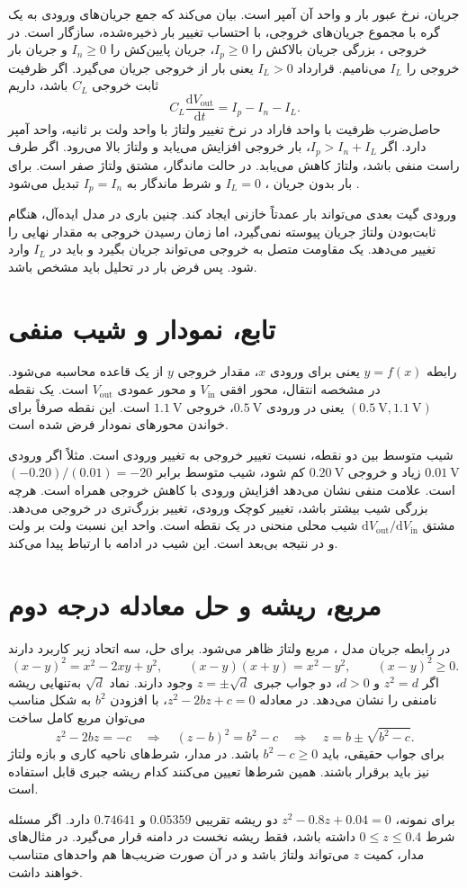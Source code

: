 جریان، نرخ عبور بار و واحد آن آمپر است.
 بیان می‌کند که جمع جریان‌های
ورودی به یک گره با مجموع جریان‌های خروجی، با احتساب تغییر بار
ذخیره‌شده، سازگار است. در خروجی ، بزرگی جریان
بالاکش را \(I_p\ge0\)، جریان پایین‌کش را \(I_n\ge0\) و جریان
بار خروجی را \(I_L\) می‌نامیم. قرارداد \(I_L>0\) یعنی بار از
خروجی جریان می‌گیرد. اگر ظرفیت ثابت خروجی \(C_L\) باشد، داریم
\[
 C_L\frac{\mathrm{d}V_{\mathrm{out}}}{\mathrm{d}t}
 =I_p-I_n-I_L.
\]
حاصل‌ضرب ظرفیت با واحد فاراد در نرخ تغییر ولتاژ با واحد ولت بر
ثانیه، واحد آمپر دارد. اگر \(I_p>I_n+I_L\)، بار خروجی افزایش
می‌یابد و ولتاژ بالا می‌رود. اگر طرف راست منفی باشد، ولتاژ کاهش
می‌یابد. در حالت ماندگار، مشتق ولتاژ صفر است. برای بار بدون جریان
، \(I_L=0\) و شرط ماندگار به \(I_p=I_n\) تبدیل می‌شود
\cite[صفحه ۸۸]{weste}\cite[اسلاید ۳]{dcslides}.

ورودی گیت بعدی می‌تواند بار عمدتاً خازنی ایجاد کند. چنین باری در
مدل ایده‌آل، هنگام ثابت‌بودن ولتاژ جریان پیوسته نمی‌گیرد، اما زمان
رسیدن خروجی به مقدار نهایی را تغییر می‌دهد. یک مقاومت متصل به
خروجی می‌تواند جریان  بگیرد و باید در \(I_L\) وارد شود.
پس فرض بار در تحلیل باید مشخص باشد.

\section*{تابع، نمودار و شیب منفی}
رابطه \(y=f(x)\) یعنی برای ورودی \(x\)، مقدار خروجی \(y\) از یک
قاعده محاسبه می‌شود. در مشخصه انتقال، محور افقی
\(V_{\mathrm{in}}\) و محور عمودی \(V_{\mathrm{out}}\) است.
یک نقطه \((\qty{0.5}{\volt},\qty{1.1}{\volt})\) یعنی در ورودی
\(\qty{0.5}{\volt}\)، خروجی \(\qty{1.1}{\volt}\) است.
این نقطه صرفاً برای خواندن محورهای نمودار فرض شده است.

شیب متوسط بین دو نقطه، نسبت تغییر خروجی به تغییر ورودی است.
مثلاً اگر ورودی \(\qty{0.01}{\volt}\) زیاد و خروجی
\(\qty{0.20}{\volt}\) کم شود، شیب متوسط برابر
\((-0.20)/(0.01)=-20\) است. علامت منفی نشان می‌دهد افزایش
ورودی با کاهش خروجی همراه است. هرچه بزرگی شیب بیشتر باشد، تغییر
کوچک ورودی، تغییر بزرگ‌تری در خروجی می‌دهد.
مشتق \(\mathrm{d}V_{\mathrm{out}}/\mathrm{d}V_{\mathrm{in}}\)
شیب محلی منحنی در یک نقطه است. واحد این نسبت ولت بر ولت و در
نتیجه بی‌بعد است. این شیب در ادامه با  ارتباط پیدا می‌کند.

\section*{مربع، ریشه و حل معادله درجه دوم}
در رابطه جریان مدل ، مربع ولتاژ ظاهر می‌شود. برای
حل، سه اتحاد زیر کاربرد دارند
\[
 (x-y)^2=x^2-2xy+y^2,\qquad
 (x-y)(x+y)=x^2-y^2,\qquad
 (x-y)^2\ge0.
\]
اگر \(z^2=d\) و \(d>0\)، دو جواب جبری
\(z=\pm\sqrt d\) وجود دارند. نماد \(\sqrt d\) به‌تنهایی ریشه
نامنفی را نشان می‌دهد. در معادله \(z^2-2bz+c=0\)، با افزودن
\(b^2\) به شکل مناسب می‌توان مربع کامل ساخت
\[
 z^2-2bz=-c
 \quad\Longrightarrow\quad
 (z-b)^2=b^2-c
 \quad\Longrightarrow\quad
 z=b\pm\sqrt{b^2-c}.
\]
برای جواب حقیقی، باید \(b^2-c\ge0\) باشد. در مدار، شرط‌های ناحیه
کاری و بازه ولتاژ نیز باید برقرار باشند. همین شرط‌ها تعیین می‌کنند
کدام ریشه جبری قابل استفاده است.

برای نمونه، \(z^2-0.8z+0.04=0\) دو ریشه تقریبی
\(0.05359\) و \(0.74641\) دارد. اگر مسئله شرط \(0\le z\le0.4\)
داشته باشد، فقط ریشه نخست در دامنه قرار می‌گیرد. در مثال‌های مدار،
کمیت \(z\) می‌تواند ولتاژ باشد و در آن صورت ضریب‌ها هم واحدهای
متناسب خواهند داشت.

